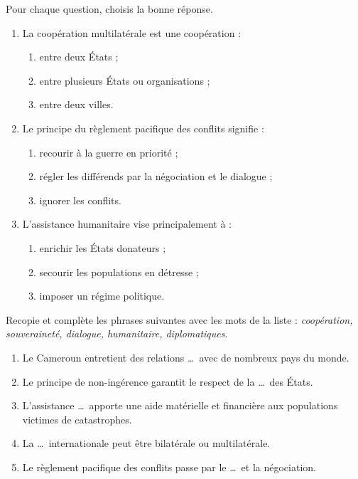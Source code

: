 \documentclass[11pt]{article}
\begin{document}
\begin{exercice}[QCM]
Pour chaque question, choisis la bonne réponse.
\begin{enumerate}
  \item La coopération multilatérale est une coopération :
  \begin{enumerate}
    \item[a)] entre deux États ;
    \item[b)] entre plusieurs États ou organisations ;
    \item[c)] entre deux villes.
  \end{enumerate}
  \item Le principe du règlement pacifique des conflits signifie :
  \begin{enumerate}
    \item[a)] recourir à la guerre en priorité ;
    \item[b)] régler les différends par la négociation et le dialogue ;
    \item[c)] ignorer les conflits.
  \end{enumerate}
  \item L'assistance humanitaire vise principalement à :
  \begin{enumerate}
    \item[a)] enrichir les États donateurs ;
    \item[b)] secourir les populations en détresse ;
    \item[c)] imposer un régime politique.
  \end{enumerate}
\end{enumerate}
\end{exercice}

\begin{exercice}
Recopie et complète les phrases suivantes avec les mots de la liste : \emph{coopération, souveraineté, dialogue, humanitaire, diplomatiques}.
\begin{enumerate}
  \item Le Cameroun entretient des relations \dots\ avec de nombreux pays du monde.
  \item Le principe de non-ingérence garantit le respect de la \dots\ des États.
  \item L'assistance \dots\ apporte une aide matérielle et financière aux populations victimes de catastrophes.
  \item La \dots\ internationale peut être bilatérale ou multilatérale.
  \item Le règlement pacifique des conflits passe par le \dots\ et la négociation.
\end{enumerate}
\end{exercice}
\end{document}
